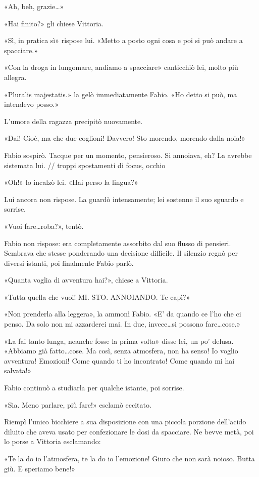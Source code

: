 «Ah, beh, grazie\ldots»

«Hai finito?» gli chiese Vittoria.

«Sì, in pratica sì» rispose lui. «Metto a posto ogni cosa e poi si può andare a spacciare.»

«Con la droga in lungomare, andiamo a spacciare» canticchiò lei, molto più allegra.

«Pluralis majestatis.» la gelò immediatamente Fabio. «Ho detto si può, ma intendevo posso.»

L'umore della ragazza precipitò nuovamente.

«Dai! Cioè, ma che due coglioni! Davvero! Sto morendo, morendo dalla noia!»

Fabio sospirò. Tacque per un momento, pensieroso. Si annoiava, eh? La avrebbe sistemata lui. // troppi spostamenti di focus, occhio

«Oh!» lo incalzò lei. «Hai perso la lingua?»

Lui ancora non rispose. La guardò intensamente; lei sostenne il suo sguardo e sorrise.

«Vuoi fare\ldots roba?», tentò.

Fabio non rispose: era completamente assorbito dal suo flusso di pensieri. Sembrava che stesse ponderando una decisione difficile. Il silenzio regnò per diversi istanti, poi finalmente Fabio parlò.

«Quanta voglia di avventura hai?», chiese a Vittoria.

«Tutta quella che vuoi! MI. STO. ANNOIANDO. Te capì?»

«Non prenderla alla leggera», la ammonì Fabio. «E' da quando ce l'ho che ci penso. Da solo non mi azzarderei mai. In due, invece\ldots si possono fare\ldots cose.»

«La fai tanto lunga, neanche fosse la prima volta» disse lei, un po' delusa. «Abbiamo già fatto\ldots cose. Ma così, senza atmosfera, non ha senso! Io voglio avventura! Emozioni! Come quando ti ho incontrato! Come quando mi hai salvata!»

Fabio continuò a studiarla per qualche istante, poi sorrise.

«Sia. Meno parlare, più fare!» esclamò eccitato.

Riempì l'unico bicchiere a sua disposizione con una piccola porzione dell'acido diluito che aveva usato per confezionare le dosi da spacciare. Ne bevve metà, poi lo porse a Vittoria esclamando:

«Te la do io l'atmosfera, te la do io l'emozione! Giuro che non sarà noioso. Butta giù. E speriamo bene!»

